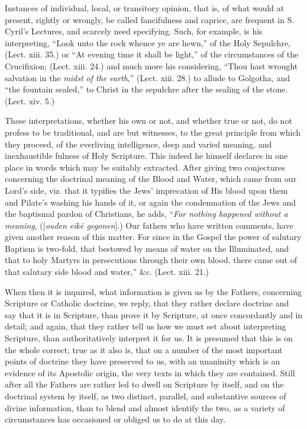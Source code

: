 Instances of individual,
local, or transitory opinion, that is, of what would at present,
rightly or wrongly, be called fancifulness and caprice, are frequent
in S. Cyril's Lectures, and scarcely need specifying. Such, for
example, is his interpreting, ``Look unto the rock whence ye are hewn,''
of the Holy Sepulchre, (Lect. xiii. 35.) or ``At evening time it shall
be light,'' of the circumstances of the Crucifixion; (Lect. xiii. 24.)
and much more his considering, ``Thou hast wrought salvation in the \emph{midst
of the earth},'' (Lect. xiii. 28.) to allude to Golgotha, and ``the
fountain sealed,'' to Christ in the sepulchre after the sealing of the
stone. (Lect. xiv. 5.)

These interpretations, whether
his own or not, and whether true or not, do not profess to be
traditional, and are but witnesses, to the great principle from which
they proceed, of the everliving intelligence, deep and varied meaning,
and inexhaustible fulness of Holy Scripture. This indeed he himself
declares in one place in words which may be suitably extracted. After
giving two conjectures concerning the doctrinal meaning of the Blood
and Water, which came from our Lord's side, viz. that it typifies the
Jews' imprecation of His blood upon them and Pilate's washing his
hands of it, or again the condemnation of the Jews and the baptismal
pardon of Christians, he adds, ``\emph{For nothing happened without a
meaning}, ([\emph{ouden eik\={e} gegonen}].) Our fathers who
have written comments, have given another reason of this matter. For
since in the Gospel the power of salutary Baptism is two-fold, that
bestowed by means of water on the Illuminated, and that to holy
Martyrs in persecutions through their own blood, there came out of
that salutary side blood and water,'' \&c. (Lect. xiii. 21.)

When then it is inquired, what
information is given us by the Fathers, concerning Scripture or
Catholic doctrine, we reply, that they rather declare doctrine and say
that it is in Scripture, than prove it by Scripture, at once
concordantly and in detail; and again, that they rather tell us how we
must set about interpreting Scripture, than authoritatively interpret
it for us. It is presumed that this is on the whole correct; true as
it also is, that on a number of the most important points of doctrine
they have preserved to us, with an unanimity which is an evidence of
its Apostolic origin, the very texts in which they are contained.
Still after all the Fathers are rather led to dwell on Scripture by
itself, and on the doctrinal system by itself, as two distinct,
parallel, and substantive sources of divine information, than to blend
and almost identify the two, as a variety of circumstances has
occasioned or obliged us to do at this day.


